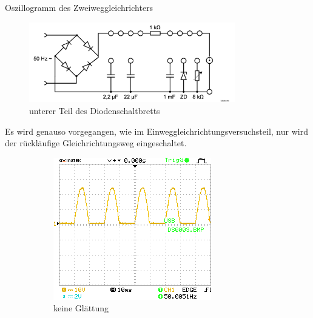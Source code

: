 \documentclass{article}
\theoremstyle{definition}
\begin{document}
\clearpage
\begin{aufgabe}{Oszillogramm des Zweiweggleichrichters}
    \aufbau
    \begin{figure}[H]
        \centering
        \includegraphics[width=0.8\textwidth]{figs/Aufbau4.png}
        \caption{unterer Teil des Diodenschaltbretts\cite{anleitung}}
        \label{aufbau4}
    \end{figure}
    Es wird genauso vorgegangen, wie im Einweggleichrichtungsversuchsteil, nur wird der rückläufige Gleichrichtungsweg eingeschaltet.
    \messwerte
    \begin{figure}[H]
        \begin{subfigure}[b]{0.49 \textwidth}
            \includegraphics[width=\textwidth]{MesswerteVersuch2/DS0003.png}
            \caption{keine Glättung}
            \label{a3_a}
        \end{subfigure}
        \hfill
        \begin{subfigure}[b]{0.49 \textwidth}

\end{subfigure}
\end{figure}
\end{aufgabe}
\end{document}
